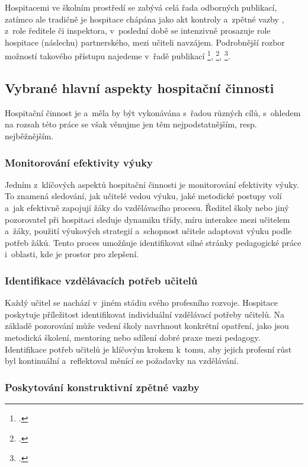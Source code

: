 Hospitacemi ve školním prostředí se zabývá celá řada odborných publikací, zatímco ale tradičně je hospitace chápána jako akt kontroly a~zpětné vazby , z~role ředitele či inspektora, v~poslední době se intenzivně prosazuje  role hospitace (náslechu) partnerského, mezi učiteli navzájem. Podrobnější rozbor možností takového přístupu najedeme v~řadě publikací \footcite{ucime-ucit-se}, \footcite{metody-a-formy}, \footcite{rozvijejici-hospitace}. 

\subsection{Vybrané hlavní aspekty hospitační činnosti}

Hospitační činnost je a~měla by být vykonávána s~řadou různých cílů, s~ohledem na rozsah této práce se však věnujme jen těm nejpodstatnějším, resp. nejběžnějším.

\subsubsection{Monitorování efektivity výuky}

Jedním z~klíčových aspektů hospitační činnosti je monitorování efektivity výuky. To znamená sledování, jak učitelé vedou výuku, jaké metodické postupy volí a~jak efektivně zapojují žáky do vzdělávacího procesu. Ředitel školy nebo jiný pozorovatel při hospitaci sleduje dynamiku třídy, míru interakce mezi učitelem a~žáky, použití výukových strategií a~schopnost učitele adaptovat výuku podle potřeb žáků. Tento proces umožňuje identifikovat silné stránky pedagogické práce i~oblasti, kde je prostor pro zlepšení.

\subsubsection{Identifikace vzdělávacích potřeb učitelů}

Každý učitel se nachází v~jiném stádiu svého profesního rozvoje. Hospitace poskytuje příležitost identifikovat individuální vzdělávací potřeby učitelů. Na základě pozorování může vedení školy navrhnout konkrétní opatření, jako jsou metodická školení, mentoring nebo sdílení dobré praxe mezi pedagogy. Identifikace potřeb učitelů je klíčovým krokem k~tomu, aby jejich profesní růst byl kontinuální a~reflektoval měnící se požadavky na vzdělávání.

\subsubsection{Poskytování konstruktivní zpětné vazby}

